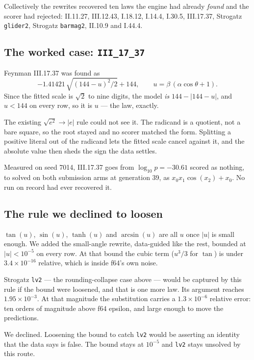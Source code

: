 \documentclass[11pt,a4paper]{article}
\begin{document}
Collectively the rewrites recovered ten laws the engine had already \emph{found}
and the scorer had rejected: II.11.27, III.12.43, I.18.12, I.14.4, I.30.5,
III.17.37, Strogatz \texttt{glider2}, Strogatz \texttt{barmag2}, II.10.9 and
I.44.4.

\subsection{The worked case: \texttt{III\_17\_37}}

Feynman III.17.37 was found as
\[
-1.41421\,\sqrt{(144 - u)^2 / 2} + 144,
\qquad u = \beta\,(\alpha\cos\theta + 1).
\]
Since the fitted scale is $\sqrt2$ to nine digits, the model \emph{is} $144 - |144 - u|$,
and $u < 144$ on every row, so it is $u$ --- the law, exactly.

The existing $\sqrt{e^2} \to |e|$ rule could not see it. The radicand is a
quotient, not a bare square, so the root stayed and no scorer matched the form.
Splitting a positive literal out of the radicand lets the fitted scale cancel
against it, and the absolute value then sheds the sign the data settles.

Measured on seed 7014, III.17.37 goes from $\log_{10} p = -30.61$ scored as
nothing, to solved on both submission arms at generation 39, as
$x_0 x_1 \cos(x_2) + x_0$. No run on record had ever recovered it.

\subsection{The rule we declined to loosen}

$\tan(u)$, $\sin(u)$, $\tanh(u)$ and $\arcsin(u)$ are all $u$ once $|u|$ is small
enough. We added the small-angle rewrite, data-guided like the rest, bounded at
$|u| < 10^{-5}$ on every row. At that bound the cubic term ($u^3/3$ for $\tan$)
is under $3.4\times10^{-16}$ relative, which is inside f64's own noise.

Strogatz \texttt{lv2} --- the rounding-collapse case above --- would be captured
by this rule if the bound were loosened, and that is one more law. Its argument
reaches $1.95\times10^{-3}$. At that magnitude the substitution carries a
$1.3\times10^{-6}$ relative error: ten orders of magnitude above f64 epsilon, and
large enough to move the predictions.

We declined. Loosening the bound to catch \texttt{lv2} would be asserting an
identity that the data says is false. The bound stays at $10^{-5}$ and
\texttt{lv2} stays unsolved by this route.
\end{document}
